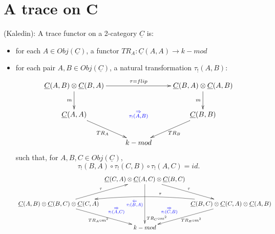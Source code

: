 \section{A trace on C} \label{sec:2cat_trace_eg}
%
\begin{defn} \label{def:trace_functor}
(Kaledin): A trace functor on a 
2-category $\underline{C}$ is:
\begin{itemize}
	\item for each $A \in Obj(\underline{C})$, a functor 
	$TR_A: \underline{C}(A,A) \to k-mod$
	\item for each pair $A, B \in Obj(\underline{C})$, a natural transformation
	$\tau_!(A,B)$:
	$$\xymatrix{
	\underline{C}(A,B) \otimes \underline{C}(B,A)
	\ar[rr]^{\tau = flip}
	\ar[d]_{m}
	&& \underline{C}(B,A) \otimes \underline{C}(A,B)
	\ar[d]_{m} \\
	\underline{C}(A,A)
	\ar[rd]_{TR_A}
	& \textcolor{blue}{\substack{\Rightarrow\\ \tau_!(A,B)}}
	& \underline{C}(B,B) 
	\ar[ld]^{TR_B}\\
	& k-mod
	}$$
	such that, for $A,B,C \in Obj(\underline{C})$, 
	\begin{equation} \label{eq:trace_cocycle}
	\tau_!(B,A) \circ \tau_!(C,B) \circ \tau_!(A,C) = id.
	\end{equation}
	$$\xymatrixcolsep{0.25pc}
	\xymatrix{
	& \underline{C}(C,A) \otimes \underline{C}(A,C) \otimes \underline{C}(B,C) 
	\ar[rd]^{\tau}
	\ar[dd]_{\textcolor{blue}{
		\substack{\Leftarrow\\ \tau_!(B,A)}}}^{\substack{
		\\\\\\\\\\\\\\\\\\TR_C \circ m^2}}\\
	\underline{C}(A,B) \otimes \underline{C}(B,C) \otimes \underline{C}(C,A) 
	\ar[ru]^{\tau}
	\ar[rd]^{\textcolor{blue}{\quad \quad \quad \substack{\Rightarrow\\ \tau_!(A,C)}}}_{TR_A\circ m^2}
	&& \underline{C}(B,C) \otimes \underline{C}(C,A) \otimes \underline{C}(A,B)
	\ar@/_1pc/[ll]_{\quad \quad \quad \quad \quad \tau}
	\ar[ld]_{\textcolor{blue}{\substack{\Rightarrow\\ \tau_!(C,B)}}\quad \quad\quad \quad}^{TR_B \circ m^2}\\
	& k-mod
	}$$
\end{itemize}
\end{defn}

